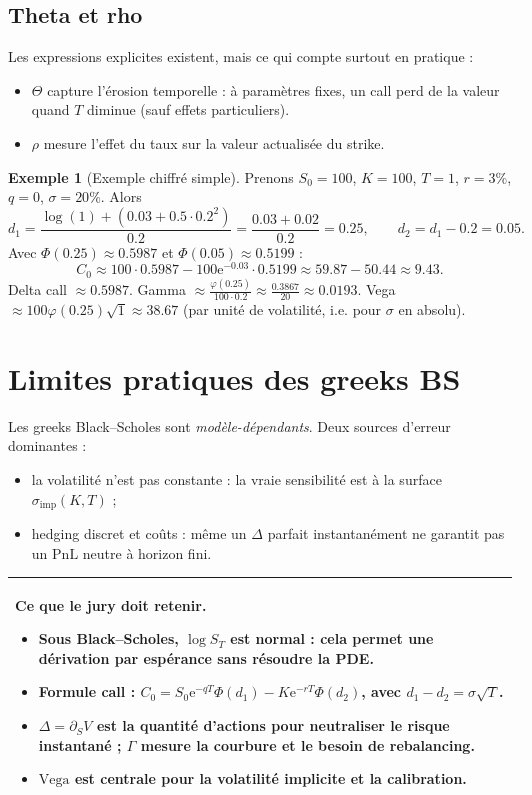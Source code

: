 \documentclass[11pt,a4paper]{report}
\newcommand{\ee}{\mathrm{e}}
\newcommand{\1}{\mathbbm{1}}
\newcommand{\vega}{\mathrm{Vega}}
\newcommand{\PnL}{\mathrm{PnL}}
\theoremstyle{definition}
\newtheorem{example}{Exemple}[chapter]
\theoremstyle{plain}
\theoremstyle{remark}
\newenvironment{jurybox}{%
  \begin{center}
  \setlength{\tabcolsep}{6pt}%
  \renewcommand{\arraystretch}{1.1}%
  \begin{tabular}{|p{0.94\textwidth}|}
  \hline
  \small\textbf{Ce que le jury doit retenir.}\par\medskip
}{%
  \\ \hline
  \end{tabular}
  \end{center}
}
\begin{document}
\subsection{Theta et rho}
Les expressions explicites existent, mais ce qui compte surtout en pratique :
\begin{itemize}
\item $\Theta$ capture l'érosion temporelle : à paramètres fixes, un call perd de la valeur quand $T$ diminue (sauf effets particuliers).
\item $\rho$ mesure l'effet du taux sur la valeur actualisée du strike.
\end{itemize}

\begin{example}[Exemple chiffré simple]
Prenons $S_0=100$, $K=100$, $T=1$, $r=3\%$, $q=0$, $\sigma=20\%$.
Alors
\[
d_1=\frac{\log(1)+(0.03+0.5\cdot 0.2^2)}{0.2}= \frac{0.03+0.02}{0.2}=0.25,
\qquad
d_2=d_1-0.2=0.05.
\]
Avec $\Phi(0.25)\approx 0.5987$ et $\Phi(0.05)\approx 0.5199$ :
\[
C_0 \approx 100\cdot 0.5987 - 100\ee^{-0.03}\cdot 0.5199
\approx 59.87 - 50.44 \approx 9.43.
\]
Delta call $\approx 0.5987$.
Gamma $\approx \frac{\varphi(0.25)}{100\cdot 0.2} \approx \frac{0.3867}{20} \approx 0.0193$.
Vega $\approx 100\varphi(0.25)\sqrt{1} \approx 38.67$ (par unité de volatilité, i.e. pour $\sigma$ en absolu).
\end{example}

\section{Limites pratiques des greeks BS}
Les greeks Black--Scholes sont \emph{modèle-dépendants}.
Deux sources d'erreur dominantes :
\begin{itemize}
  \item la volatilité n'est pas constante : la vraie sensibilité est à la surface $\sigma_{\mathrm{imp}}(K,T)$ ;
  \item hedging discret et coûts : même un $\Delta$ parfait instantanément ne garantit pas un $\PnL$ neutre à horizon fini.
\end{itemize}

\begin{jurybox}
\begin{itemize}
\item Sous Black--Scholes, $\log S_T$ est normal : cela permet une dérivation par espérance sans résoudre la PDE.
\item Formule call : $C_0 = S_0\ee^{-qT}\Phi(d_1)-K\ee^{-rT}\Phi(d_2)$, avec $d_1-d_2=\sigma\sqrt{T}$.
\item $\Delta=\partial_S V$ est la quantité d'actions pour neutraliser le risque instantané ; $\Gamma$ mesure la courbure et le besoin de rebalancing.
\item $\vega$ est centrale pour la volatilité implicite et la calibration.
\end{itemize}
\end{jurybox}
\end{document}

